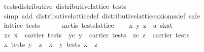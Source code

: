\begin{isabellebody}
\endisatagproof
{\isafoldproof}%
%
\isadelimproof
\isanewline
%
\endisadelimproof
\isanewline
{}\isamarkupfalse%
\ tests{}distributive{}\ {}distributive{}lattice\ tests{}\isanewline
%
\isadelimproof
%
\endisadelimproof
%
\isatagproof
{}\isamarkupfalse%
\ {}simp\ add{}\ distributive{}lattice{}def\ distributive{}lattice{}axioms{}def{}\ safe{}\isanewline
\ \ \isamarkupfalse%
\ {}lattice\ tests{}\isanewline
\ \ \ \ \isamarkupfalse%
\ {}metis\ tests{}lattice{}\isanewline
\isanewline
\ \ \isamarkupfalse%
\ x\ y\ z\ {}{}\ {}{}a\ skat{}\isanewline
\ \ \isamarkupfalse%
\ xc{}\ {}x\ {}\ carrier\ tests{}\ \ yc{}\ {}y\ {}\ carrier\ tests{}\ \ zc{}\ {}z\ {}\ carrier\ tests{}\isanewline
\ \ \isamarkupfalse%
\ {}{}x\ {}\isactrlbsub tests\isactrlesub \ {}y\ {}\ z{}{}\ {}\ {}x\ {}\ y\ {}\isactrlbsub tests\isactrlesub \ x\ {}\ z{}{}\isanewline

\end{isabellebody}
